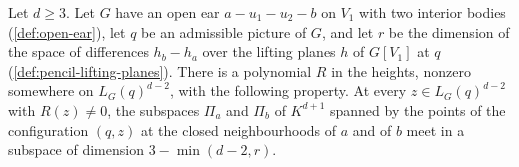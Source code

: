 \begin{lemma}
  \label{lem:pencil-d-planes-meet}
  \leanok
  Let $d \ge 3$. Let $G$ have an open ear
  $a - u_1 - u_2 - b$ on $V_1$ with two interior bodies
  (\cref{def:open-ear}), let $q$ be an admissible picture of $G$, and let
  $r$ be the dimension of the space of differences $h_b - h_a$ over the
  lifting planes $h$ of $G[V_1]$ at $q$
  (\cref{def:pencil-lifting-planes}). There is a polynomial $R$ in the
  heights, nonzero somewhere on $L_G(q)^{d-2}$, with the following
  property. At every $z \in L_G(q)^{d-2}$ with $R(z) \neq 0$, the
  subspaces $\Pi_a$ and $\Pi_b$ of $K^{d+1}$ spanned by the points of the
  configuration $(q, z)$ at the closed neighbourhoods of $a$ and of $b$
  meet in a subspace of dimension $3 - \min(d - 2, r)$.
\end{lemma}
